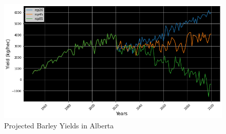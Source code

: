 \documentclass[11pt]{article}
\numberwithin{equation}{section}
\begin{document}
\begin{figure}[h!]
 \centering
 \includegraphics[scale=0.4]{ABproj}
 \caption{Projected Barley Yields in Alberta}
 \label{ABprojections}
\end{figure}
\end{document}
